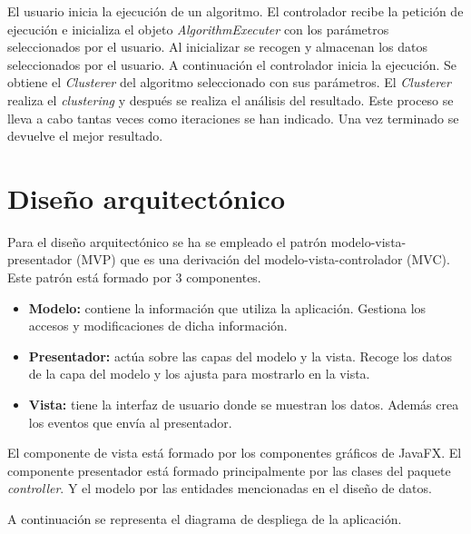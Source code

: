 
El usuario inicia la ejecución de un algoritmo. El controlador recibe la petición de ejecución e inicializa el objeto \emph{AlgorithmExecuter} con los parámetros seleccionados por el usuario. Al inicializar se recogen y almacenan los datos seleccionados por el usuario. A continuación el controlador inicia la ejecución. Se obtiene el \emph{Clusterer} del algoritmo seleccionado con sus parámetros. El \emph{Clusterer} realiza el \emph{clustering} y después se realiza el análisis del resultado. Este proceso se lleva a cabo tantas veces como iteraciones se han indicado. Una vez terminado se devuelve el mejor resultado.

\section{Diseño arquitectónico}
Para el diseño arquitectónico se ha se empleado el patrón modelo-vista-presentador (MVP) que es una derivación del modelo-vista-controlador (MVC). Este patrón está formado por 3 componentes.
\begin{itemize}
	\item \textbf{Modelo:} contiene la información que utiliza la aplicación. Gestiona los accesos y modificaciones de dicha información.
	\item \textbf{Presentador:} actúa sobre las capas del modelo y la vista. Recoge los datos de la capa del modelo y los ajusta para mostrarlo en la vista.
	\item \textbf{Vista:} tiene la interfaz de usuario donde se muestran los datos. Además crea los eventos que envía al presentador.
\end{itemize}


El componente de vista está formado por los componentes gráficos de JavaFX. El componente presentador está formado principalmente por las clases del paquete \emph{controller}. Y el modelo por las entidades mencionadas en el diseño de datos.

A continuación se representa el diagrama de despliega de la aplicación.
